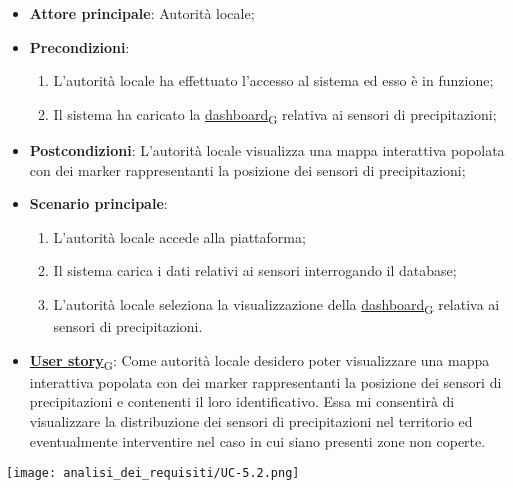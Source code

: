 \begin{itemize}
	\item \textbf{Attore principale}: Autorità locale;
	\item \textbf{Precondizioni}:
	      \begin{enumerate}
		      \item L'autorità locale ha effettuato l'accesso al sistema ed esso è in funzione;
		      \item Il sistema ha caricato la \href{https://7last.github.io/docs/rtb/documentazione-interna/glossario\#dashboard}{dashboard\textsubscript{G}} relativa ai sensori di precipitazioni;
	      \end{enumerate}
	\item \textbf{Postcondizioni}: L'autorità locale visualizza una mappa interattiva popolata con dei marker rappresentanti la posizione dei sensori di precipitazioni;
	\item \textbf{Scenario principale}:
	      \begin{enumerate}
		      \item L'autorità locale accede alla piattaforma;
		      \item Il sistema carica i dati relativi ai sensori interrogando il database;
		      \item L'autorità locale seleziona la visualizzazione della \href{https://7last.github.io/docs/rtb/documentazione-interna/glossario\#dashboard}{dashboard\textsubscript{G}} relativa ai sensori di precipitazioni.
	      \end{enumerate}
	\item \href{https://7last.github.io/docs/rtb/documentazione-interna/glossario\#user-story}{\textbf{User story}\textsubscript{G}}:
	      Come autorità locale desidero poter visualizzare una mappa interattiva popolata con dei marker rappresentanti la posizione dei sensori di precipitazioni
	      e contenenti il loro identificativo. Essa mi consentirà di visualizzare la distribuzione dei sensori di precipitazioni nel territorio ed
	      eventualmente interventire nel caso in cui siano presenti zone non coperte.
\end{itemize}
\begin{center}
	\texttt{[image: analisi\_dei\_requisiti/UC-5.2.png]}
\end{center}


